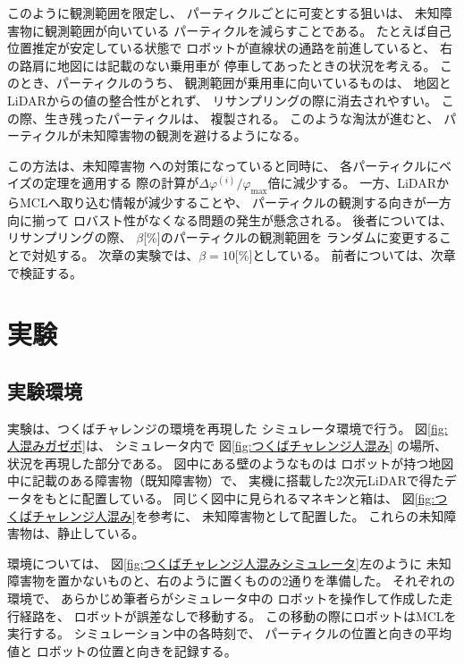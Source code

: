 \documentclass{jarticle}
\begin{document}
このように観測範囲を限定し、
パーティクルごとに可変とする狙いは、
未知障害物に観測範囲が向いている
パーティクルを減らすことである。
たとえば自己位置推定が安定している状態で
ロボットが直線状の通路を前進していると、
右の路肩に地図には記載のない乗用車が
停車してあったときの状況を考える。
このとき、パーティクルのうち、
観測範囲が乗用車に向いているものは、
地図とLiDARからの値の整合性がとれず、
リサンプリングの際に消去されやすい。
この際、生き残ったパーティクルは、
複製される。
このような淘汰が進むと、
パーティクルが未知障害物の観測を避けるようになる。

この方法は、未知障害物
への対策になっていると同時に、
各パーティクルにベイズの定理を適用する
際の計算が$\Delta\varphi^{(i)}/\varphi_\text{max}$倍に減少する。
一方、LiDARからMCLへ取り込む情報が減少することや、
パーティクルの観測する向きが一方向に揃って
ロバスト性がなくなる問題の発生が懸念される。
後者については、リサンプリングの際、
$\beta$[\%]のパーティクルの観測範囲を
ランダムに変更することで対処する。
次章の実験では、$\beta=10$[\%]としている。
前者については、次章で検証する。

\section{実験}%

\subsection{実験環境}

実験は、つくばチャレンジの環境を再現した
シミュレータ環境で行う。
図\ref{fig:人混みガゼボ}は、
シミュレータ内で
図\ref{fig:つくばチャレンジ人混み}
の場所、状況を再現した部分である。
図中にある壁のようなものは
ロボットが持つ地図中に記載のある障害物（既知障害物）で、
実機に搭載した2次元LiDARで得たデータをもとに配置している。
同じく図中に見られるマネキンと箱は、
図\ref{fig:つくばチャレンジ人混み}を参考に、
未知障害物として配置した。
これらの未知障害物は、静止している。

環境については、
図\ref{fig:つくばチャレンジ人混みシミュレータ}左のように
未知障害物を置かないものと、右のように置くものの2通りを準備した。
それぞれの環境で、
あらかじめ筆者らがシミュレータ中の
ロボットを操作して作成した走行経路を、
ロボットが誤差なしで移動する。
この移動の際にロボットはMCLを実行する。
シミュレーション中の各時刻で、
パーティクルの位置と向きの平均値と
ロボットの位置と向きを記録する。
\end{document}
